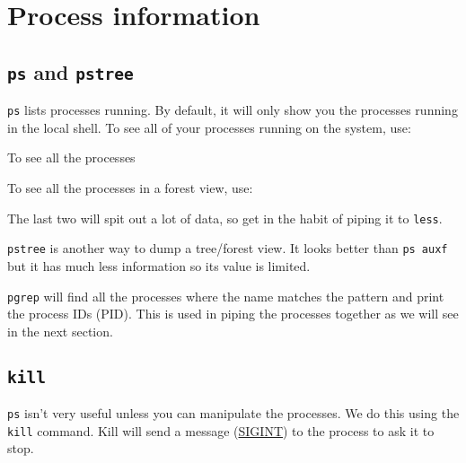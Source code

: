 \section{Process information}

\subsection{\texttt{ps} and \texttt{pstree}}
\lstinline|ps| lists processes running. By default, it will only show you the processes
running in the local shell. To see all of your processes running on the system,
use:

\begin{prompt}
\end{prompt}

To see all the processes

\begin{prompt}
\end{prompt}

To see all the processes in a forest view, use:

\begin{prompt}
\end{prompt}

The last two will spit out a lot of data, so get in the habit of piping it to
\lstinline|less|.

\lstinline|pstree| is another way to dump a tree/forest view. It looks better than
\lstinline|ps auxf| but it has much less information so its value is limited.

\lstinline|pgrep| will find all the processes where the name matches the pattern and
print the process IDs (PID). This is used in piping the processes together as we
will see in the next section.

\subsection{\texttt{kill}}
\lstinline|ps| isn't very useful unless you can manipulate the processes. We do this
using the \lstinline|kill| command. Kill will send a message
(\href{https://en.wikipedia.org/wiki/Unix_signal#POSIX_signals}{SIGINT}) to the
process to ask it to stop.

\begin{prompt}
\end{prompt}

